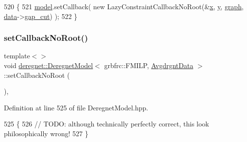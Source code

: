 \begin{DoxyCode}
520                                                            \{
521     \hyperlink{classderegnet_1_1DeregnetModel_a30d525de2086e342b33fe3e45ede4947}{model}.setCallback( \textcolor{keyword}{new} LazyConstraintCallbackNoRoot(&\hyperlink{classderegnet_1_1DeregnetModel_a360c980f3fec4dfbab50e9bb06a933a8}{x}, \hyperlink{classderegnet_1_1DeregnetModel_ae76df61afe302b939165facf3dd21ac8}{y}, \hyperlink{classderegnet_1_1DeregnetModel_a3cd2f54b8e061ef5bed32708d9bc1ef1}{graph}, 
      \hyperlink{classderegnet_1_1DeregnetModel_ad5399761cf6293a702f3800bda4806d1}{data}->\hyperlink{classderegnet_1_1DeregnetData_a3637c87366454adc152487fc2f5cfede}{gap\_cut}) );
522 \}
\end{DoxyCode}
\mbox{\label{classderegnet_1_1DeregnetModel_a53356bbd16a9a2bfb51fcdf35da9cc7a}} 
\subsubsection{\texorpdfstring{set\+Callback\+No\+Root()}{setCallbackNoRoot()}\hspace{0.1cm}{\footnotesize\ttfamily [3/3]}}
{\footnotesize\ttfamily template$<$$>$ \\
void \hyperlink{classderegnet_1_1DeregnetModel}{deregnet\+::\+Deregnet\+Model}$<$ grbfrc\+::\+F\+M\+I\+LP, \hyperlink{classderegnet_1_1AvgdrgntData}{Avgdrgnt\+Data} $>$\+::set\+Callback\+No\+Root (\begin{DoxyParamCaption}{ }\end{DoxyParamCaption})\hspace{0.3cm}{\ttfamily [inline]}, {\ttfamily [private]}}



Definition at line 525 of file Deregnet\+Model.\+hpp.


\begin{DoxyCode}
525                                                                  \{
526     \textcolor{comment}{// TODO: although technically perfectly correct, this look philosophically wrong!}
527 \}
\end{DoxyCode}
\mbox{\label{classderegnet_1_1DeregnetModel_a19332c492a33a1e488ed916947d38c08}} 

